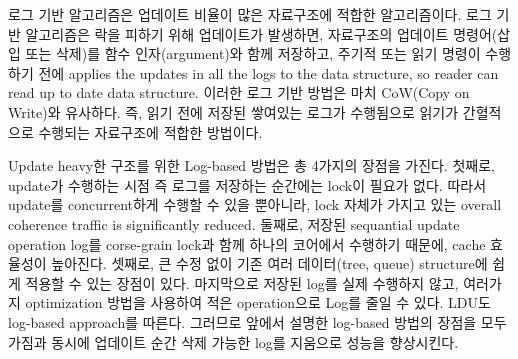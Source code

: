 
로그 기반 알고리즘은 업데이트 비율이 많은 자료구조에 적합한 알고리즘이다. 
로그 기반 알고리즘은 락을 피하기 위해 업데이트가 발생하면, 자료구조의 업데이트 
명령어(삽입 또는 삭제)를 함수 인자(argument)와 함께 저장하고, 주기적 또는 읽기 명령이
 수행하기 전에 applies the updates in all the logs to the data structure, so reader
 can read up to date data structure.
이러한 로그 기반 방법은 마치 CoW(Copy on Write)와 유사하다.
즉, 읽기 전에 저장된 쌓여있는 로그가 수행됨으로 읽기가 간혈적으로 수행되는 자료구조에 적합한 방법이다.

Update heavy한 구조를 위한 Log-based 방법은 총 4가지의 장점을 가진다. 
첫째로, update가 수행하는 시점 즉 로그를 저장하는 순간에는 lock이 필요가 없다. 
따라서 update를 concurrent하게 수행할 수 있을 뿐아니라, lock 자체가 가지고 있는 overall
coherence traffic is significantly reduced.
둘째로, 저장된 sequantial update operation log를 corse-grain lock과 함께 하나의 코어에서 수행하기
때문에, cache 효율성이 높아진다.
셋째로, 큰 수정 없이 기존 여러 데이터(tree, queue) structure에 쉽게 적용할 수 있는 장점이 있다.
마지막으로 저장된 log를 실제 수행하지 않고, 여러가지 optimization 방법을 사용하여 적은 operation으로 Log를 줄일 수
있다. 
LDU도 log-based approach를 따른다. 그러므로 앞에서 설명한 log-based 방법의 장점을 모두 가짐과 동시에
업데이트 순간 삭제 가능한 log를 지움으로 성능을 향상시킨다.


